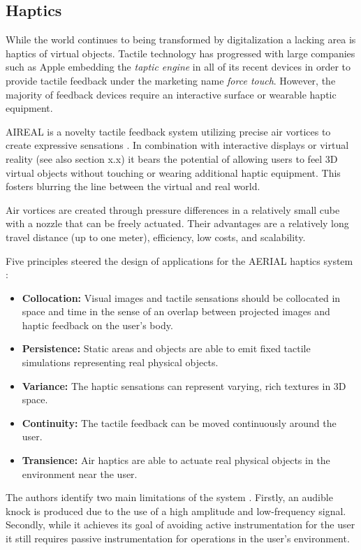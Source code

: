 \subsection{Haptics} \label{sec:haptics}
While the world continues to being transformed by digitalization a lacking area is haptics of virtual objects.
Tactile technology has progressed with large companies such as Apple embedding the \emph{taptic engine} in all of its recent devices in order to provide tactile feedback under the marketing name \emph{force touch}.
However, the majority of feedback devices require an interactive surface or wearable haptic equipment.

AIREAL is a novelty tactile feedback system utilizing precise air vortices to create expressive sensations \cite{Sodhi2013}.
In combination with interactive displays or virtual reality (see also section x.x) it bears the potential of allowing users to feel 3D virtual objects without touching or wearing additional haptic equipment.
This fosters blurring the line between the virtual and real world.

Air vortices are created through pressure differences in a relatively small cube with a nozzle that can be freely actuated.
Their advantages are a relatively long travel distance (up to one meter), efficiency, low costs, and scalability.

Five principles steered the design of applications for the AERIAL haptics system \cite{Sodhi2013}:
\begin{itemize}
    \item \textbf{Collocation:} Visual images and tactile sensations should be collocated in space and time in the sense of an overlap between projected images and haptic feedback on the user's body.
    \item \textbf{Persistence:} Static areas and objects are able to emit fixed tactile simulations representing real physical objects.
    \item \textbf{Variance:} The haptic sensations can represent varying, rich textures in 3D space.
    \item \textbf{Continuity:} The tactile feedback can be moved continuously around the user.
    \item \textbf{Transience:} Air haptics are able to actuate real physical objects in the environment near the user.
\end{itemize}

The authors identify two main limitations of the system \cite{Sodhi2013}.
Firstly, an audible knock is produced due to the use of a high amplitude and low-frequency signal.
Secondly, while it achieves its goal of avoiding active instrumentation for the user it still requires passive instrumentation for operations in the user's environment.